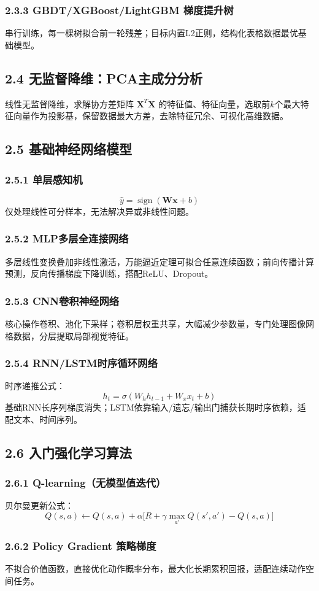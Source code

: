 \documentclass[11pt,a4paper]{article}
\DeclareMathOperator{\sign}{sign}
\begin{document}
\subsubsection{2.3.3 GBDT/XGBoost/LightGBM 梯度提升树}
串行训练，每一棵树拟合前一轮残差；目标内置L2正则，结构化表格数据最优基础模型。

\subsection{2.4 无监督降维：PCA主成分分析}
线性无监督降维，求解协方差矩阵 $\boldsymbol{X}^T\boldsymbol{X}$ 的特征值、特征向量，选取前$k$个最大特征向量作为投影基，保留数据最大方差，去除特征冗余、可视化高维数据。

\subsection{2.5 基础神经网络模型}
\subsubsection{2.5.1 单层感知机}
\[
\hat{y}=\sign(\boldsymbol{W}\boldsymbol{x}+b)
\]
仅处理线性可分样本，无法解决异或非线性问题。

\subsubsection{2.5.2 MLP多层全连接网络}
多层线性变换叠加非线性激活，万能逼近定理可拟合任意连续函数；前向传播计算预测，反向传播梯度下降训练，搭配ReLU、Dropout。

\subsubsection{2.5.3 CNN卷积神经网络}
核心操作卷积、池化下采样；卷积层权重共享，大幅减少参数量，专门处理图像网格数据，分层提取局部视觉特征。

\subsubsection{2.5.4 RNN/LSTM时序循环网络}
时序递推公式：
\[
h_t = \sigma(W_h h_{t-1}+W_x x_t+b)
\]
基础RNN长序列梯度消失；LSTM依靠输入/遗忘/输出门捕获长期时序依赖，适配文本、时间序列。

\subsection{2.6 入门强化学习算法}
\subsubsection{2.6.1 Q-learning（无模型值迭代）}
贝尔曼更新公式：
\[
Q(s,a) \leftarrow Q(s,a) + \alpha\big[R+\gamma \max_{a'}Q(s',a') - Q(s,a)\big]
\]

\subsubsection{2.6.2 Policy Gradient 策略梯度}
不拟合价值函数，直接优化动作概率分布，最大化长期累积回报，适配连续动作空间任务。
\end{document}
